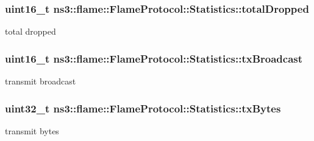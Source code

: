 \subsubsection[{\texorpdfstring{total\+Dropped}{totalDropped}}]{\setlength{\rightskip}{0pt plus 5cm}uint16\+\_\+t ns3\+::flame\+::\+Flame\+Protocol\+::\+Statistics\+::total\+Dropped}\hypertarget{structns3_1_1flame_1_1FlameProtocol_1_1Statistics_a9bbb45f9d30c589661435636b6065ef7}{}\label{structns3_1_1flame_1_1FlameProtocol_1_1Statistics_a9bbb45f9d30c589661435636b6065ef7}
total dropped 
\subsubsection[{\texorpdfstring{tx\+Broadcast}{txBroadcast}}]{\setlength{\rightskip}{0pt plus 5cm}uint16\+\_\+t ns3\+::flame\+::\+Flame\+Protocol\+::\+Statistics\+::tx\+Broadcast}\hypertarget{structns3_1_1flame_1_1FlameProtocol_1_1Statistics_a0ba404c358cf7b3dda7eef14e20ddeac}{}\label{structns3_1_1flame_1_1FlameProtocol_1_1Statistics_a0ba404c358cf7b3dda7eef14e20ddeac}


transmit broadcast 

\subsubsection[{\texorpdfstring{tx\+Bytes}{txBytes}}]{\setlength{\rightskip}{0pt plus 5cm}uint32\+\_\+t ns3\+::flame\+::\+Flame\+Protocol\+::\+Statistics\+::tx\+Bytes}\hypertarget{structns3_1_1flame_1_1FlameProtocol_1_1Statistics_a6e9193135a5ce66fc2195afe99118bb9}{}\label{structns3_1_1flame_1_1FlameProtocol_1_1Statistics_a6e9193135a5ce66fc2195afe99118bb9}


transmit bytes 

